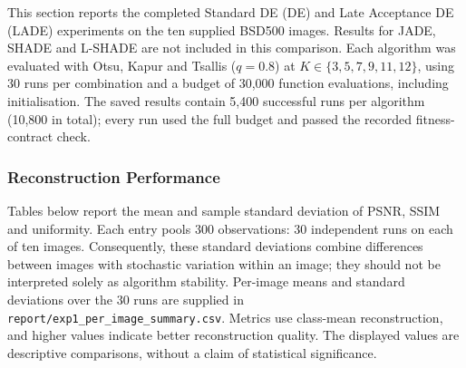\documentclass[review]{elsarticle}
\begin{document}
This section reports the completed Standard DE (DE) and Late Acceptance DE (LADE) experiments on the ten supplied BSD500 images. Results for JADE, SHADE and L-SHADE are not included in this comparison. Each algorithm was evaluated with Otsu, Kapur and Tsallis ($q=0.8$) at $K\in\{3,5,7,9,11,12\}$, using 30 runs per combination and a budget of 30,000 function evaluations, including initialisation. The saved results contain 5,400 successful runs per algorithm (10,800 in total); every run used the full budget and passed the recorded fitness-contract check.

\subsubsection{Reconstruction Performance}

Tables below report the mean and sample standard deviation of PSNR, SSIM and uniformity. Each entry pools 300 observations: 30 independent runs on each of ten images. Consequently, these standard deviations combine differences between images with stochastic variation within an image; they should not be interpreted solely as algorithm stability. Per-image means and standard deviations over the 30 runs are supplied in \texttt{report/exp1\_per\_image\_summary.csv}. Metrics use class-mean reconstruction, and higher values indicate better reconstruction quality. The displayed values are descriptive comparisons, without a claim of statistical significance.

\begin{table}[htbp]
\centering
\small
\caption{PSNR (dB) on BSD500 using Otsu: pooled mean $\pm$ sample standard deviation across 300 observations per entry (10 images, 30 runs each).}
\label{tab:bsd-otsu-psnr}
\end{table}
\end{document}
